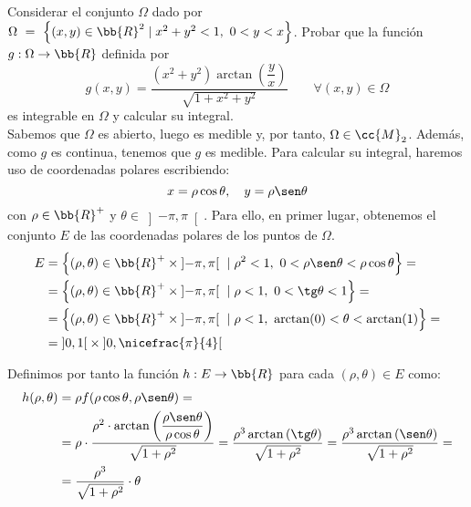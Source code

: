 \begin{ejercicio}
    Considerar el conjunto $\Omega$ dado por $\Omega~=~\left\{\left(x,y\right)\in \bb{R}^2 \mid x^2 + y^2 < 1,~0<y<x\right\}$.
    Probar que la función
    $g:\Omega\to \bb{R}$ definida por
    \begin{equation*}
        g(x,y) = \dfrac{(x^2+y^2)\arctan\left(\dfrac{y}{x}\right)}{\sqrt{1+x^2+y^2}}\qquad \forall (x,y)\in \Omega
    \end{equation*}
    es integrable en $\Omega$ y calcular su integral.\\

    Sabemos que $\Omega$ es abierto, luego es medible y, por tanto, $\Omega\in \cc{M}_2$. Además, como $g$ es continua, tenemos que $g$ es medible.
    Para calcular su integral, haremos uso de coordenadas polares escribiendo:
    \begin{equation*}
        x = \rho\cos\theta, \quad y = \rho\sen\theta
    \end{equation*}
    con $\rho\in \bb{R}^+$ y $\theta\in \left]-\pi, \pi\right[$. Para ello, en primer lugar, obtenemos el conjunto $E$ de las coordenadas polares de los puntos de $\Omega$.
    \begin{align*}
        E &= \left\{ (\rho, \theta) \in \bb{R}^+\times \left]-\pi, \pi\right[ ~\mid \rho^2 < 1,~0<\rho\sen\theta<\rho\cos\theta \right\} =\\
        &= \left\{ (\rho, \theta) \in \bb{R}^+\times \left]-\pi, \pi\right[ ~\mid \rho < 1,~0<\tg\theta<1 \right\} =\\
        &= \left\{ (\rho, \theta) \in \bb{R}^+\times \left]-\pi, \pi\right[ ~\mid \rho < 1,~\arctan(0)<\theta<\arctan(1)\right\} =\\
        &= \left]0, 1\right[\times \left]0, \nicefrac{\pi}{4}\right[
    \end{align*}

    Definimos por tanto la función $h: E \to \bb{R}$ para cada $(\rho, \theta) \in E$ como:
    \begin{align*}
        h(\rho, \theta) &= \rho f(\rho\cos\theta, \rho\sen\theta)=\\
        &= \rho\cdot \dfrac{\rho^2 \cdot \arctan\left(\dfrac{\rho\sen\theta}{\rho\cos\theta}\right)}{\sqrt{1+\rho^2}}
        = \dfrac{\rho^3\arctan\left(\tg\theta\right)}{\sqrt{1+\rho^2}} = \dfrac{\rho^3\arctan\left(\sen\theta\right)}{\sqrt{1+\rho^2}} =\\
        &= \dfrac{\rho^3}{\sqrt{1+\rho^2}}\cdot \theta
    \end{align*}


\end{ejercicio}
